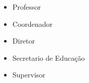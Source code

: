 


\Large

\begin{itemize}
	\item Professor
	\item Coordenador
	\item Diretor
	\item Secretario de Educação
	\item Supervisor
\end{itemize}

\vfill
\pagebreak



		
	
